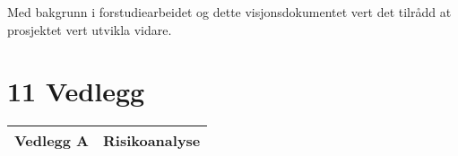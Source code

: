 \documentclass[12pt]{article}
\begin{document}
Med bakgrunn i forstudiearbeidet og dette visjonsdokumentet vert det tilrådd at prosjektet vert utvikla vidare. 

\section{11 Vedlegg}




\begin{flushleft}
\tablefirsthead{}
\tablehead{}
\tabletail{}
\tablelasttail{}
\begin{supertabular}{|m{1.0670599in}|m{5.27546in}|}
\hline
Vedlegg A &
Risikoanalyse\\\hline
\end{supertabular}
\end{flushleft}
\end{document}
